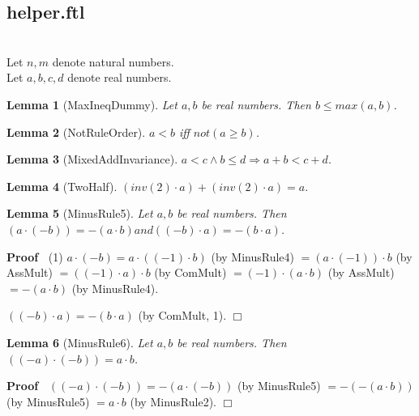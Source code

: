 \documentclass{article}
\newenvironment{forthel}{\begin{leftbar}}{\end{leftbar}}
\newenvironment{proof}{\noindent\textbf{Proof\ }}{\hspace*{\fill}$\Box$\medskip}
\newtheorem{lemma}{Lemma}
\newcommand{\dotequal}{=}
\begin{document}
\subsection{helper.ftl}

\begin{forthel}
	\\
	Let $n,m$ denote natural numbers.\\
	Let $a,b,c,d$ denote real numbers.
	
	
	
	\begin{lemma}[MaxIneqDummy]
	Let $a,b$ be real numbers. Then $b \leq max(a,b)$.
	\end{lemma}
	
	\begin{lemma}[NotRuleOrder]
	$a < b$ iff $not(a \geq b)$.
	\end{lemma}
	
	\begin{lemma}[MixedAddInvariance]
	$a < c \wedge b \leq d \Rightarrow a + b < c + d$.
	\end{lemma}
	
	\begin{lemma}[TwoHalf]
	$(inv(2) \cdot a) + (inv(2) \cdot a) = a$.
	\end{lemma}
	
	\begin{lemma}[MinusRule5]
	Let $a,b$ be real numbers. 
	Then $(a \cdot (-b)) = -(a \cdot b) and ((-b) \cdot a) = -(b \cdot a)$.
	\end{lemma}
	\begin{proof}
	(1) $a \cdot (-b) \dotequal a \cdot ((-1) \cdot b)$ (by MinusRule4)
	$\dotequal (a \cdot (-1)) \cdot b$ (by AssMult)
	$\dotequal ((-1) \cdot a) \cdot b$ (by ComMult)
	$\dotequal (-1) \cdot (a \cdot b)$ (by AssMult)
	$\dotequal -(a \cdot b)$ (by MinusRule4).
	
	$((-b) \cdot a) \dotequal -(b \cdot a)$ (by ComMult, 1).
	\end{proof}
	
	\begin{lemma}[MinusRule6]
	Let $a,b$ be real numbers. 
	Then $((-a) \cdot (-b)) = a \cdot b$.
	\end{lemma}
	\begin{proof}
	$((-a) \cdot (-b)) \dotequal -(a \cdot (-b))$ (by MinusRule5)
	$\dotequal -(-(a \cdot b))$ (by MinusRule5)
	$\dotequal a \cdot b$ (by MinusRule2).
	\end{proof}
	

\end{forthel}
\end{document}
